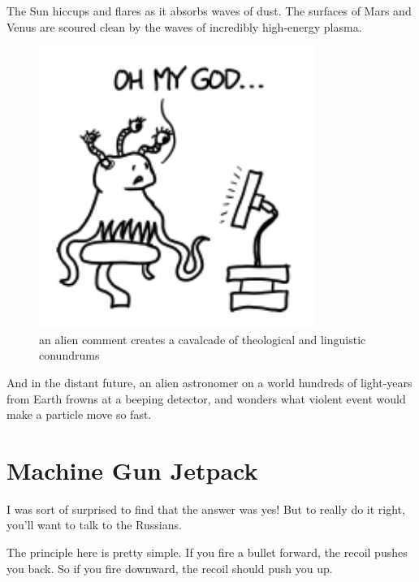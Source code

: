 {The Sun hiccups and flares as it absorbs waves of dust. The surfaces of Mars and Venus are scoured clean by the waves of incredibly high-energy plasma.}

\begin{figure}[!htbp]
\centering
\includegraphics[scale=0.5, max width=0.8\textwidth]{imgs/a/20/diamond_alien.png}
\caption{an alien comment creates a cavalcade of theological and linguistic conundrums}
\end{figure}

{And in the distant future, an alien astronomer on a world hundreds of light-years from Earth frowns at a beeping detector, and wonders what violent event would make a particle move so fast.}

{
\chapter{Machine Gun Jetpack}
}

\hfill{}

{I was sort of surprised to find that the answer was yes! But to really do it right, you’ll want to talk to the Russians.}

{The principle here is pretty simple. If you fire a bullet forward, the recoil pushes you back. So if you fire downward, the recoil should push you up.}

